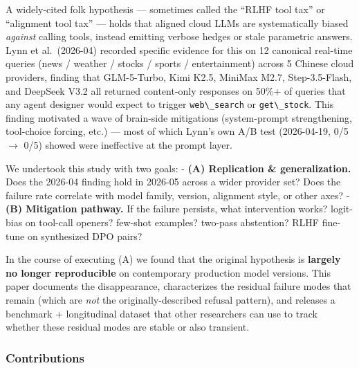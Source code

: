 \documentclass[11pt]{article}
\providecommand{\passthrough}[1]{#1}
\begin{document}
A widely-cited folk hypothesis --- sometimes called the ``RLHF tool
tax'' or ``alignment tool tax'' --- holds that aligned cloud LLMs are
systematically biased \emph{against} calling tools, instead emitting
verbose hedges or stale parametric answers. Lynn et al.~(2026-04)
recorded specific evidence for this on 12 canonical real-time queries
(news / weather / stocks / sports / entertainment) across 5 Chinese
cloud providers, finding that GLM-5-Turbo, Kimi K2.5, MiniMax M2.7,
Step-3.5-Flash, and DeepSeek V3.2 all returned content-only responses on
50\%+ of queries that any agent designer would expect to trigger
\passthrough{\lstinline!web\_search!} or
\passthrough{\lstinline!get\_stock!}. This finding motivated a wave of
brain-side mitigations (system-prompt strengthening, tool-choice
forcing, etc.) --- most of which Lynn's own A/B test (2026-04-19, 0/5 $\rightarrow$
0/5) showed were ineffective at the prompt layer.

We undertook this study with two goals: - \textbf{(A) Replication \&
generalization.} Does the 2026-04 finding hold in 2026-05 across a wider
provider set? Does the failure rate correlate with model family,
version, alignment style, or other axes? - \textbf{(B) Mitigation
pathway.} If the failure persists, what intervention works? logit-bias
on tool-call openers? few-shot examples? two-pass abstention? RLHF
fine-tune on synthesized DPO pairs?

In the course of executing (A) we found that the original hypothesis is
\textbf{largely no longer reproducible} on contemporary production model
versions. This paper documents the disappearance, characterizes the
residual failure modes that remain (which are \emph{not} the
originally-described refusal pattern), and releases a benchmark +
longitudinal dataset that other researchers can use to track whether
these residual modes are stable or also transient.

\subsubsection{Contributions}\label{contributions}
\end{document}
